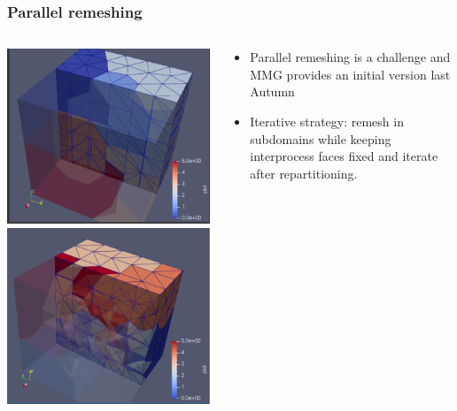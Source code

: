 \documentclass{beamer}
\begin{document}
\begin{frame}
	\frametitle{Parallel remeshing}
	\begin{columns}
		\begin{column}{.5\linewidth}
			\includegraphics[width=.7\linewidth]{par-mesh-n6-1.png}\\
			\includegraphics[width=.7\linewidth]{par-remesh-n6-1.png}
		\end{column}
		\begin{column}{.5\linewidth}
			\begin{itemize}
				\item Parallel remeshing is a challenge and MMG provides an initial version last Autumn
				\item Iterative strategy: remesh in subdomains while keeping interprocess faces fixed and iterate after repartitioning.
			\end{itemize}
		\end{column}
	\end{columns}

	
	

\end{frame}
\end{document}
